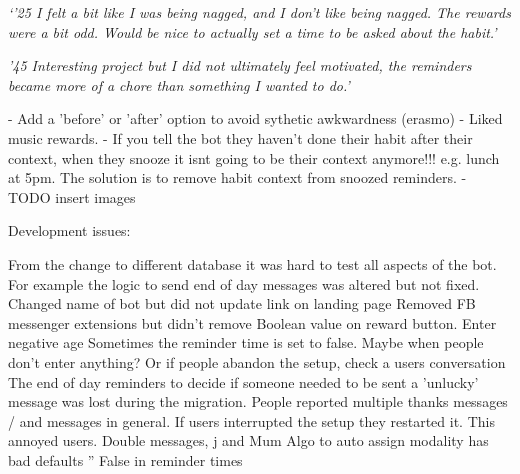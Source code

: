 \textit{`'2\/5 I felt a bit like I was being nagged, and I don't like being nagged. The rewards were a bit odd. Would be nice to actually set a time to be asked about the habit.'}


\textit{'4\/5 Interesting project but I did not ultimately feel motivated, the reminders became more of a chore than something I wanted to do.'}




 - Add a 'before' or 'after' option to avoid sythetic awkwardness (erasmo)
  - Liked music rewards.
  - If you tell the bot they haven't done their habit after their context, when they snooze it isnt going to be their context anymore!!! e.g. lunch at 5pm. The solution is to remove habit context from snoozed reminders.
  - TODO insert images\newline


Development issues:

From the change to different database it was hard to test all aspects of the bot. For example the logic to send end of day messages was altered but not fixed.
Changed name of bot but did not update link on landing page
Removed FB messenger extensions but didn't remove Boolean value on reward button.
Enter negative age
Sometimes the reminder time is set to false. Maybe when people don't enter anything? Or if people abandon the setup, check a users conversation
The end of day reminders to decide if someone needed to be sent a 'unlucky' message was lost during the migration.
People reported multiple thanks messages / and messages in general.
If users interrupted the setup they restarted it. This annoyed users.
Double messages, j and Mum
Algo to auto assign modality has bad defaults ''
False in reminder times

